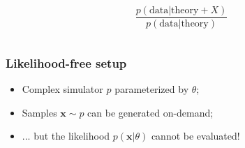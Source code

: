 \documentclass{beamer}
\begin{document}
\begin{frame}
\begin{columns}
\begin{column}{0.4\textwidth}
            $$\frac{p(\text{data} | \text{theory} + X)}{p(\text{data} | \text{theory})}$$
        \end{column}
    \end{columns}
\end{frame}


\begin{frame}
    \frametitle{Likelihood-free setup}

    \begin{itemize}
        \item Complex simulator $p$ parameterized by $\theta$;
        \item Samples $\mathbf{x} \sim p$ can be generated on-demand;
        \item ... but the likelihood {\color{red} $p(\mathbf{x}|\theta)$ cannot be evaluated}!
    \end{itemize}


\end{frame}
\end{document}
